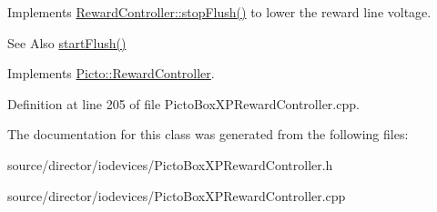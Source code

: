 Implements \hyperlink{class_picto_1_1_reward_controller_a5a14b4f103def1711b485cc05f4c53bb}{Reward\-Controller\-::stop\-Flush()} to lower the reward line voltage. 

\begin{DoxySeeAlso}{See Also}
\hyperlink{class_picto_1_1_picto_box_x_p_reward_controller_a5dc6d881ee582daaf7eae64be6f8af1e}{start\-Flush()} 
\end{DoxySeeAlso}


Implements \hyperlink{class_picto_1_1_reward_controller_a5a14b4f103def1711b485cc05f4c53bb}{Picto\-::\-Reward\-Controller}.



Definition at line 205 of file Picto\-Box\-X\-P\-Reward\-Controller.\-cpp.



The documentation for this class was generated from the following files\-:\begin{DoxyCompactItemize}
\item 
source/director/iodevices/Picto\-Box\-X\-P\-Reward\-Controller.\-h\item 
source/director/iodevices/Picto\-Box\-X\-P\-Reward\-Controller.\-cpp\end{DoxyCompactItemize}
